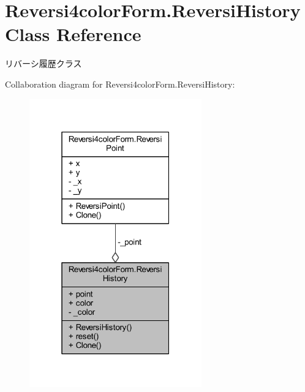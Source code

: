 \hypertarget{class_reversi4color_form_1_1_reversi_history}{}\section{Reversi4color\+Form.\+Reversi\+History Class Reference}
\label{class_reversi4color_form_1_1_reversi_history}


リバーシ履歴クラス  




Collaboration diagram for Reversi4color\+Form.\+Reversi\+History\+:
\nopagebreak
\begin{figure}[H]
\begin{center}
\leavevmode
\includegraphics[width=211pt]{class_reversi4color_form_1_1_reversi_history__coll__graph}
\end{center}
\end{figure}
